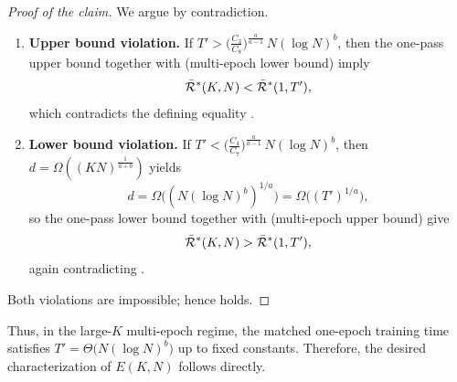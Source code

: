 \begin{proof}[Proof of the claim]
We argue by contradiction.

\begin{enumerate}
\item \textbf{Upper bound violation.}
If 
$T' > \bigl(\tfrac{C_3}{C_8}\bigr)^{\frac{a}{a-1}}\,N(\log N)^b$,
then the one-pass upper bound together with  (multi-epoch lower bound) imply
\[
\Bar{\mathcal{R}}^*(K,N)<\Bar{\mathcal{R}}^*(1,T'),
\]
which contradicts the defining equality .

\item \textbf{Lower bound violation.}
If 
$T' < \bigl(\tfrac{C_4}{C_7}\bigr)^{\frac{a}{a-1}}\,N(\log N)^b$,
then $d=\Omega\left(\left(KN\right)^{\frac{1}{a+b}}\right)$ yields
\[
d=\Omega\bigl((N(\log N)^b)^{1/a}\bigr)
=\Omega\bigl((T')^{1/a}\bigr),
\]
so the one-pass lower bound together with  (multi-epoch upper bound) give
\[
\Bar{\mathcal{R}}^*(K,N)>\Bar{\mathcal{R}}^*(1,T'),
\]
again contradicting .
\end{enumerate}
Both violations are impossible; hence  holds. 
\end{proof}

Thus, in the large-$K$ multi-epoch regime, the matched one-epoch training time satisfies $T'=\Theta\bigl(N(\log N)^b\bigr)$ up to fixed constants. Therefore, the desired characterization of $E(K,N)$ follows directly.



